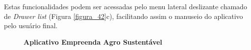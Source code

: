 Estas funcionalidades podem ser acessadas pelo menu lateral deslizante chamado de \textit{Drawer list} (Figura \ref{figura_42}c), facilitando assim o manuseio do aplicativo pelo usuário final. 

\begin{figure}[H]
\FloatBarrier
\center
\caption{\textbf{Aplicativo Empreenda Agro Sustentável}}
\qquad

\end{figure}
